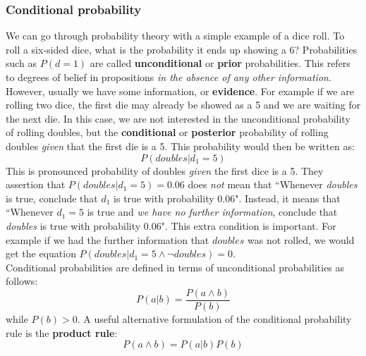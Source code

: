 \documentclass{article}
\newcommand{\n}[0]{\\[\baselineskip]}
\begin{document}
\subsubsection{Conditional probability}
We can go through probability theory with a simple example of a dice roll. To roll a six-sided dice, what is the probability it ends up showing a 6?
Probabilities such as $P(d = 1)$ are called \textbf{unconditional} or \textbf{prior} probabilities. This refers to degrees of belief in propositions \textit{in the absence of any other information}. However, usually we have some information, or \textbf{evidence}. For example if we are rolling two dice, the first die may already be showed as a 5 and we are waiting for the next die. In this case, we are not interested in the unconditional probability of rolling doubles, but the \textbf{conditional} or \textbf{posterior} probability of rolling doubles \textit{given} that the first die is a 5. This probability would then be written as:
\begin{equation}
P(doubles | d_{1} = 5)
\end{equation}
This is pronounced probability of doubles \textit{given} the first dice is a 5. They assertion that $P(doubles | d_{1} = 5) = 0.06$ does \textit{not} mean that ``Whenever \textit{doubles} is true, conclude that $d_{1}$ is true with probability 0.06". Instead, it means that ``Whenever  $d_{1} = 5$ is true and \textit{we have no further information}, conclude that \textit{doubles} is true with probability 0.06". This extra condition is important. For example if we had the further information that $doubles$ was not rolled, we would get the equation $P(doubles | d_{1} = 5 \wedge \neg doubles) = 0$.
\n
Conditional probabilities are defined in terms of unconditional probabilities as follows:
\begin{equation}
P(a|b) = \frac{P(a \wedge b)}{P(b)}
\end{equation}
while $P(b) > 0$. A useful alternative formulation of the conditional probability rule is the \textbf{product rule}:
\begin{equation}
P(a \wedge b) = P(a | b)P(b)
\end{equation}
\end{document}
